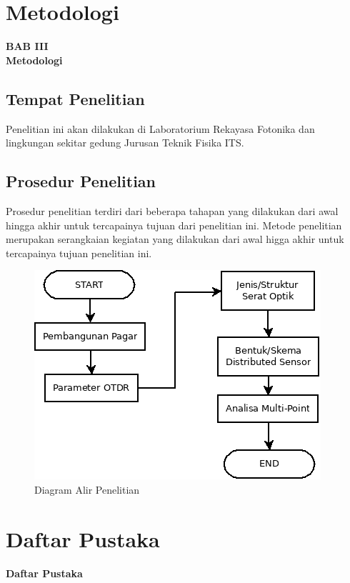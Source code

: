 \documentclass[12pt]{article}
\begin{document}
\newpage

	\section{Metodologi}
	
	\begin{center}
		{\large \textbf{BAB III}} \\
		{\large \textbf{Metodologi}}
	\end{center}
	
	\subsection{Tempat  Penelitian}
	
	Penelitian ini akan dilakukan di Laboratorium Rekayasa Fotonika dan lingkungan sekitar gedung Jurusan Teknik Fisika ITS.
	
	\subsection{Prosedur Penelitian}
	
	Prosedur penelitian terdiri dari beberapa tahapan yang dilakukan dari awal hingga akhir untuk tercapainya tujuan dari penelitian ini.
	Metode penelitian merupakan serangkaian kegiatan yang dilakukan dari awal higga akhir untuk tercapainya tujuan penelitian ini.
	
	\begin{figure}[h!]
		\centering
		\captionsetup{justification=centering}
		\includegraphics[width=0.5\linewidth]{images/Bab_3/Bab_3_1}
		\caption[Diagram Alir Penelitian]{\small{Diagram Alir Penelitian}}
	\end{figure}


\newpage

	\section{Daftar Pustaka}
	
	\begin{center}
		\textbf{Daftar Pustaka}
	\end{center}
	
	
	

	
\end{document}
